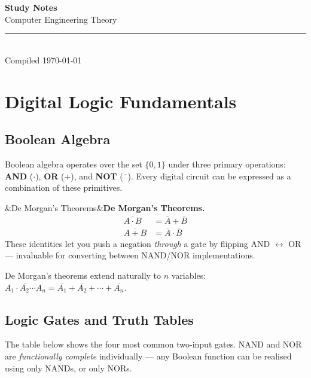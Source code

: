 \documentclass[12pt,a4paper]{article}
\newcommand{\docsubject}{Computer Engineering Theory}
\newcommand{\doctitle}{Study Notes}
\newenvironment{Note}[1][Note]{%
  \begin{tcolorbox}[notebox, title=#1]}{\end{tcolorbox}}
\newenvironment{Def}[1][]{%
  \begin{tcolorbox}[defbox]\ifx&#1&\else\textbf{#1.}\enspace\fi}{\end{tcolorbox}}
\newcommand{\maketitlepage}{%
  \begin{titlepage}
    \pagecolor{AnthDark}
    \color{AnthLight}
    \vspace*{4cm}
    \begin{center}
      {\Huge\bfseries\sffamily \doctitle}\\[0.6em]
      {\large\sffamily\color{AnthOrange} \docsubject}\\[2em]
      \color{AnthMidGray}\rule{0.4\textwidth}{0.4pt}\\[1.5em]
      {\small\sffamily\color{AnthMidGray} Compiled \today}
    \end{center}
    \vfill
  \end{titlepage}
  \pagecolor{AnthLight}
  \color{AnthDark}
}
\begin{document}
\maketitlepage

\thispagestyle{empty}
{
  \hypersetup{hidelinks}
  \tableofcontents
}
\newpage

\section{Digital Logic Fundamentals}

\subsection{Boolean Algebra}

Boolean algebra operates over the set $\{0, 1\}$ under three primary operations:
\textbf{AND} ($\cdot$), \textbf{OR} ($+$), and \textbf{NOT} ($\overline{\phantom{x}}$).
Every digital circuit can be expressed as a combination of these primitives.

\begin{Def}[De Morgan's Theorems]
  \begin{align}
    \overline{A \cdot B} &= \overline{A} + \overline{B} \\
    \overline{A + B}     &= \overline{A} \cdot \overline{B}
  \end{align}
  These identities let you push a negation \emph{through} a gate by flipping
  AND $\leftrightarrow$ OR — invaluable for converting between NAND/NOR implementations.
\end{Def}

\begin{Note}
  De Morgan's theorems extend naturally to $n$ variables:
  $\overline{A_1 \cdot A_2 \cdots A_n} = \overline{A_1} + \overline{A_2} + \cdots + \overline{A_n}$.
\end{Note}

\subsection{Logic Gates and Truth Tables}

The table below shows the four most common two-input gates. NAND and NOR are
\emph{functionally complete} individually — any Boolean function can be realised
using only NANDs, or only NORs.
\end{document}
